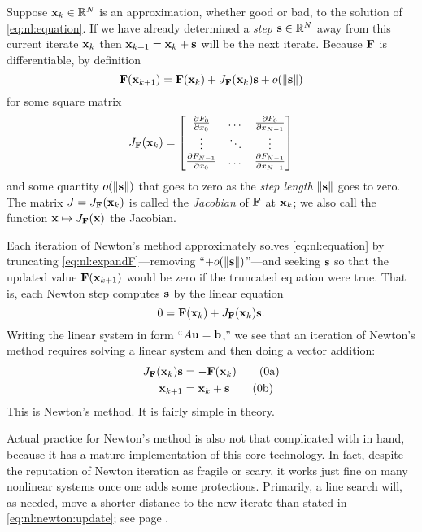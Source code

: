 Suppose $\mathbf{x}_k\in\mathbb{R}^N$ is an approximation, whether good or bad, to the solution of \eqref{eq:nl:equation}.  If we have already determined a \emph{step} $\mathbf{s}\in\mathbb{R}^N$ away from this current iterate $\mathbf{x}_k$ then $\mathbf{x}_{k+1} = \mathbf{x}_k + \mathbf{s}$ will be the next iterate.  Because $\mathbf{F}$ is differentiable, by definition
\begin{equation}
    \mathbf{F}(\mathbf{x}_{k+1}) = \mathbf{F}(\mathbf{x}_k) + J_{\mathbf{F}}(\mathbf{x}_k) \mathbf{s} + o(\|\mathbf{s}\|)  \label{eq:nl:expandF}
\end{equation}
for some square matrix
\begin{equation}
J_{\mathbf{F}}(\mathbf{x}_k) = \begin{bmatrix}
    \frac{\partial F_0}{\partial x_0} & \dots & \frac{\partial F_0}{\partial x_{N-1}} \\
    \vdots & \ddots & \vdots \\
    \frac{\partial F_{N-1}}{\partial x_0} & \dots & \frac{\partial F_{N-1}}{\partial x_{N-1}}  \end{bmatrix}  \label{eq:nl:jacdefn}
\end{equation}
and some quantity $o(\|\mathbf{s}\|)$ that goes to zero as the \emph{step length} $\|\mathbf{s}\|$ goes to zero.  The matrix $J = J_{\mathbf{F}}(\mathbf{x}_k)$ is called the \emph{Jacobian} of $\mathbf{F}$ at $\mathbf{x}_k$; we also call the function $\mathbf{x} \mapsto J_{\mathbf{F}}(\mathbf{x})$ the Jacobian.

Each iteration of Newton's method approximately solves \eqref{eq:nl:equation} by truncating \eqref{eq:nl:expandF}---removing ``$+o(\|\mathbf{s}\|)$''---and seeking $\mathbf{s}$ so that the updated value $\mathbf{F}(\mathbf{x}_{k+1})$ would be zero if the truncated equation were true.  That is, each Newton step computes $\mathbf{s}$ by the linear equation
\begin{equation}
    0 = \mathbf{F}(\mathbf{x}_k) + J_{\mathbf{F}}(\mathbf{x}_k) \mathbf{s}.
\end{equation}
Writing the linear system in form ``$A\mathbf{u}=\mathbf{b}$,'' we see that an iteration of Newton's method requires solving a linear system and then doing a vector addition:
\label{eq:nl:newton}  %
\begin{align}
    J_{\mathbf{F}}(\mathbf{x}_k) \mathbf{s} &= - \mathbf{F}(\mathbf{x}_k)  \label{eq:nl:newton:eq} \tag{\theequation a} \\
    \mathbf{x}_{k+1} &= \mathbf{x}_k + \mathbf{s}  \label{eq:nl:newton:update} \tag{\theequation b}
\end{align}
This is Newton's method.  It is fairly simple in theory.

Actual practice for Newton's method is also not that complicated with \PETSc in hand, because it has a mature implementation of this core technology.  In fact, despite the reputation of Newton iteration as fragile or scary, it works just fine on many nonlinear systems once one adds some protections.  Primarily, a line search will, as needed, move a shorter distance to the new iterate than stated in \eqref{eq:nl:newton:update}; see page \pageref{sec:linesearch}.

